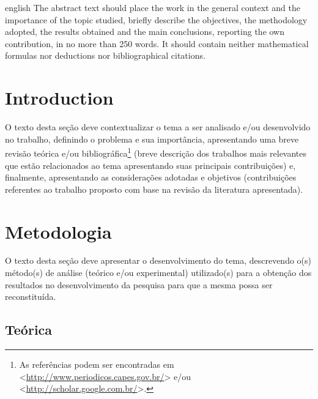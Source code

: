 \documentclass[%
  article,%
  10pt,%
  a4paper,%
  fleqn,%
  oneside,%
  sumario = tradicional,%
  chapter = TITLE,%
  section = TITLE,%
]{abntex2}
\begin{document}
\pretextual%

\begin{paginadetitulo}%

\begin{ambienteresumo}[Abstract]%
\begin{otherlanguage*}{english}%
The abstract text should place the work in the general context and the importance of the topic studied, briefly describe the objectives, the methodology adopted, the results obtained and the main conclusions, reporting the own contribution, in no more than 250 words. It should contain neither mathematical formulas nor deductions nor bibliographical citations.
\end{otherlanguage*}
\end{ambienteresumo}

\end{paginadetitulo}

\textual%

\section{Introduction}\label{sec:intro}

O texto desta seção deve contextualizar o tema a ser analisado e/ou desenvolvido no trabalho, definindo o problema e sua importância, apresentando uma breve revisão teórica e/ou bibliográfica\footnote{As referências podem ser encontradas em <\url{http://www.periodicos.capes.gov.br/}> e/ou <\url{http://scholar.google.com.br/}>.} (breve descrição dos trabalhos mais relevantes que estão relacionados ao tema apresentando suas principais contribuições) e, finalmente, apresentando as considerações adotadas e objetivos (contribuições referentes ao trabalho proposto com base na revisão da literatura apresentada).

\section{Metodologia}\label{sec:met}

O texto desta seção deve apresentar o desenvolvimento do tema, descrevendo o(s) método(s) de análise (teórico e/ou experimental) utilizado(s) para a obtenção dos resultados no desenvolvimento da pesquisa para que a mesma possa ser reconstituída.

\subsection{Teórica}\label{ssec:teor}
\end{document}
